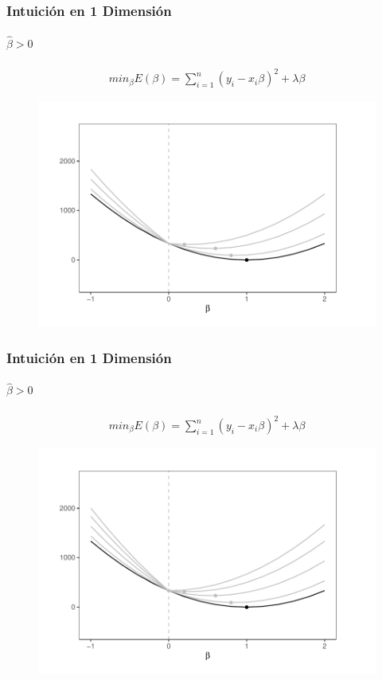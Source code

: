 \documentclass[
  shownotes,
  xcolor={svgnames},
  hyperref={colorlinks,citecolor=DarkBlue,linkcolor=andesred,urlcolor=DarkBlue}
  , aspectratio=169]{beamer}
\begin{document}
\begin{frame}[fragile]
\frametitle{Intuición en 1 Dimensión}
\framesubtitle{ $\hat{\beta}>0$}
\footnotesize
\begin{align}
 min_{\beta} E(\beta) = \sum_{i=1}^n (y_i-x_i \beta)^2 + \lambda \beta 
\end{align}

   \begin{figure}[H] \centering
            \captionsetup{justification=centering}
              \includegraphics[scale=0.6]{figures/lasso4.pdf}
 \end{figure}





\end{frame}
\begin{frame}[fragile]
\frametitle{Intuición en 1 Dimensión}
\framesubtitle{ $\hat{\beta}>0$}
\footnotesize
\begin{align}
 min_{\beta} E(\beta) = \sum_{i=1}^n (y_i-x_i \beta)^2 + \lambda \beta 
\end{align}

   \begin{figure}[H] \centering
            \captionsetup{justification=centering}
              \includegraphics[scale=0.6]{figures/lasso5.pdf}
 \end{figure}


\end{frame}
\end{document}
